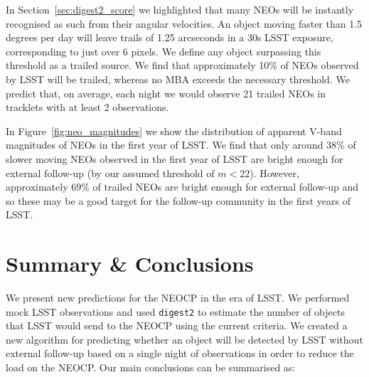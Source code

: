\documentclass[twocolumn]{aastex631}
\newcommand{\dig}{\texttt{digest2}}
\begin{document}
In Section~\ref{sec:digest2_score} we highlighted that many NEOs will be instantly recognised as such from their angular velocities. An object moving faster than 1.5 degrees per day will leave trails of 1.25 arcseconds in a 30s LSST exposure, corresponding to just over 6 pixels. We define any object surpassing this threshold as a trailed source. We find that approximately 10\% of NEOs observed by LSST will be trailed, whereas no MBA exceeds the necessary threshold. We predict that, on average, each night we would observe 21 trailed NEOs in tracklets with at least 2 observations.

In Figure~\ref{fig:neo_magnitudes} we show the distribution of apparent V-band magnitudes of NEOs in the first year of LSST. We find that only around 38\% of slower moving NEOs observed in the first year of LSST are bright enough for external follow-up (by our assumed threshold of $m < 22$). However, approximately 69\% of trailed NEOs are bright enough for external follow-up and so these may be a good target for the follow-up community in the first years of LSST.

\section{Summary \& Conclusions} \label{sec:conclusion}
We present new predictions for the NEOCP in the era of LSST. We performed mock LSST observations and used \dig{} to estimate the number of objects that LSST would send to the NEOCP using the current criteria. We created a new algorithm for predicting whether an object will be detected by LSST without external follow-up based on a single night of observations in order to reduce the load on the NEOCP. Our main conclusions can be summarised as:
\end{document}
